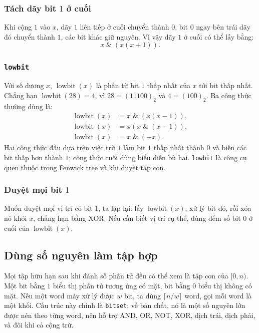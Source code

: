 \documentclass[11pt]{article}
\begin{document}
\subsubsection{\texorpdfstring{Tách dãy bit \(1\) ở cuối}{Tách dãy bit 1 ở cuối}}

Khi cộng \(1\) vào \(x\), dãy \(1\) liên tiếp ở cuối chuyển thành \(0\), bit
\(0\) ngay bên trái dãy đó chuyển thành \(1\), các bit khác giữ nguyên. Vì vậy
dãy \(1\) ở cuối có thể lấy bằng:
\[
  x\;\&\;(x\mathbin{\hat{}}(x+1)).
\]

\subsubsection{\texttt{lowbit}}

Với số dương \(x\), \(\operatorname{lowbit}(x)\) là phần từ bit \(1\) thấp nhất
của \(x\) tới bit thấp nhất. Chẳng hạn
\(\operatorname{lowbit}(28)=4\), vì \(28=(11100)_2\) và \(4=(100)_2\). Ba công
thức thường dùng là:
\[
\begin{aligned}
  \operatorname{lowbit}(x)&=x\;\&\;(x\mathbin{\hat{}}(x-1)),\\
  \operatorname{lowbit}(x)&=x\mathbin{\hat{}}(x\;\&\;(x-1)),\\
  \operatorname{lowbit}(x)&=x\;\&\;(-x).
\end{aligned}
\]
Hai công thức đầu dựa trên việc trừ \(1\) làm bit \(1\) thấp nhất thành \(0\)
và biến các bit thấp hơn thành \(1\); công thức cuối dùng biểu diễn bù hai.
\texttt{lowbit} là công cụ quen thuộc trong Fenwick tree và khi duyệt tập con.

\subsubsection{\texorpdfstring{Duyệt mọi bit \(1\)}{Duyệt mọi bit 1}}

Muốn duyệt mọi vị trí có bit \(1\), ta lặp lại: lấy
\(\operatorname{lowbit}(x)\), xử lý bit đó, rồi xóa nó khỏi \(x\), chẳng hạn
bằng XOR. Nếu cần biết vị trí cụ thể, dùng đếm số bit \(0\) ở cuối của
\(\operatorname{lowbit}(x)\).

\subsection{Dùng số nguyên làm tập hợp}

Mọi tập hữu hạn sau khi đánh số phần tử đều có thể xem là tập con của
\([0,n)\). Một bit bằng \(1\) biểu thị phần tử tương ứng có mặt, bit bằng \(0\)
biểu thị không có mặt. Nếu một word máy xử lý được \(w\) bit, ta dùng
\(\lceil n/w\rceil\) word, gọi mỗi word là một khối. Cấu trúc này chính là
\texttt{bitset}; về bản chất, nó là một số nguyên lớn được nén theo từng word,
nên hỗ trợ AND, OR, NOT, XOR, dịch trái, dịch phải, và đôi khi cả cộng trừ.
\end{document}
